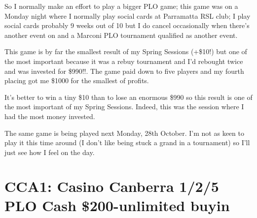 So I normally make an effort to play a bigger PLO game; this game was
on a Monday night where I normally play social cards at Parramatta RSL
club; I play social cards probably 9 weeks out of 10 but I do cancel
occasionally when there's another event on and a Marconi PLO
tournament qualified as another event.

This game is by far the smallest result of my Spring Sessions (+\$10!)
but one of the most important because it was a rebuy tournament and
I'd rebought twice and was invested for \$990!!. The game paid down to
five players and my fourth placing got me \$1000 for the smallest of
profits.

It's better to win a tiny \$10 than to lose an enormous \$990 so this
result is one of the most important of my Spring Sessions. Indeed,
this was the session where I had the most money invested.

The same game is being played next Monday, 28th October. I'm not as
keen to play it this time around (I don't like being stuck a grand in
a tournament) so I'll just see how I feel on the day.

\section*{CCA1: Casino Canberra 1/2/5 PLO Cash \$200-unlimited buyin}


